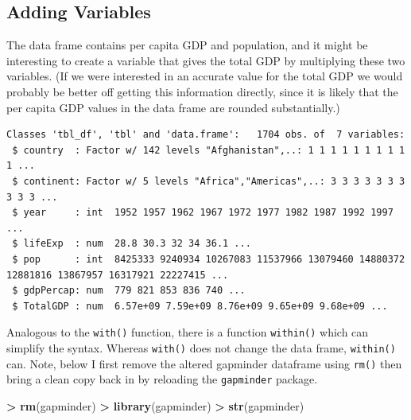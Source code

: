 \documentclass[
]{krantz}
\makeatletter
\newenvironment{Shaded}{\begin{snugshade}}{\end{snugshade}}
\newcommand{\KeywordTok}[1]{\textcolor[rgb]{0.27,0.27,0.27}{\textbf{#1}}}
\newcommand{\NormalTok}[1]{#1}
\newcommand{\OperatorTok}[1]{\textcolor[rgb]{0.43,0.43,0.43}{\textbf{#1}}}
\newcommand{\StringTok}[1]{\textcolor[rgb]{0.5,0.5,0.5}{#1}}
\newenvironment{kframe}{%
\medskip{}
\setlength{\fboxsep}{.8em}
 \def\at@end@of@kframe{}%
 \ifinner\ifhmode%
  \def\at@end@of@kframe{\end{minipage}}%
  \begin{minipage}{\columnwidth}%
 \fi\fi%
 \def\FrameCommand##1{\hskip\@totalleftmargin \hskip-\fboxsep
 \colorbox{shadecolor}{##1}\hskip-\fboxsep
     \hskip-\linewidth \hskip-\@totalleftmargin \hskip\columnwidth}%
 \MakeFramed {\advance\hsize-\width
   \@totalleftmargin\z@ \linewidth\hsize
   \@setminipage}}%
 {\par\unskip\endMakeFramed%
 \at@end@of@kframe}
\renewenvironment{Shaded}{\begin{kframe}}{\end{kframe}}
\makeatother
\begin{document}
\hypertarget{adding-variables}{%
\subsection{Adding Variables}\label{adding-variables}}

The data frame contains per capita GDP and population, and it might be interesting to create a variable that gives the total GDP by multiplying these two variables. (If we were interested in an accurate value for the total GDP we would probably be better off getting this information directly, since it is likely that the per capita GDP values in the data frame are rounded substantially.)

\begin{Shaded}
\end{Shaded}

\begin{verbatim}
Classes 'tbl_df', 'tbl' and 'data.frame':   1704 obs. of  7 variables:
 $ country  : Factor w/ 142 levels "Afghanistan",..: 1 1 1 1 1 1 1 1 1 1 ...
 $ continent: Factor w/ 5 levels "Africa","Americas",..: 3 3 3 3 3 3 3 3 3 3 ...
 $ year     : int  1952 1957 1962 1967 1972 1977 1982 1987 1992 1997 ...
 $ lifeExp  : num  28.8 30.3 32 34 36.1 ...
 $ pop      : int  8425333 9240934 10267083 11537966 13079460 14880372 12881816 13867957 16317921 22227415 ...
 $ gdpPercap: num  779 821 853 836 740 ...
 $ TotalGDP : num  6.57e+09 7.59e+09 8.76e+09 9.65e+09 9.68e+09 ...
\end{verbatim}

Analogous to the \texttt{with()} function, there is a function \texttt{within()} which can simplify the syntax. Whereas \texttt{with()} does not change the data frame, \texttt{within()} can. Note, below I first remove the altered gapminder dataframe using \texttt{rm()} then bring a clean copy back in by reloading the \texttt{gapminder} package.

\begin{Shaded}
\begin{Highlighting}[]
\OperatorTok{\textgreater{}}\StringTok{ }\KeywordTok{rm}\NormalTok{(gapminder)}
\OperatorTok{\textgreater{}}\StringTok{ }\KeywordTok{library}\NormalTok{(gapminder)}
\OperatorTok{\textgreater{}}\StringTok{ }\KeywordTok{str}\NormalTok{(gapminder)}
\end{Highlighting}
\end{Shaded}
\end{document}
